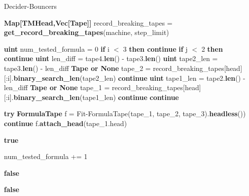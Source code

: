 \begin{algorithm}[h!]
    \caption{{\sc Decider-Bouncers}}\label{alg:decider-bouncers}
    \begin{algorithmic}[1]


        \State \textbf{Map[TMHead,Vec[Tape]]} record\_breaking\_tapes = \textbf{get\_record\_breaking\_tapes}(machine, step\_limit)

        \State \textbf{uint} num\_tested\_formula = 0
        \State \textbf{if} i $<$ 3 \textbf{then continue}
        \State \textbf{if} j $<$ 2 \textbf{then continue}
        \State \textbf{uint} len\_diff = tape4.\textbf{len}() - tape3.\textbf{len}()
        \State \textbf{uint} tape2\_len = tape3.\textbf{len}() - len\_diff
        \State \textbf{Tape or None} tape\_2 = record\_breaking\_tapes[head][:i].\textbf{binary\_search\_len}(tape2\_len)
        \State \textbf{continue}
        \EndIf
        \State
        \State \textbf{uint} tape1\_len = tape2.\textbf{len}() - len\_diff
        \State \textbf{Tape or None} tape\_1 = record\_breaking\_tapes[head][:i].\textbf{binary\_search\_len}(tape1\_len)
        \State \textbf{continue}
        \EndIf
        \State
        \State \textbf{continue}
        \EndIf

        \State

        \State \textbf{try} \textbf{FormulaTape} f = {\sc Fit-FormulaTape}(tape\_1, tape\_2, tape\_3).\textbf{headless}())
        \State \textbf{continue}
        \EndIf
        \State
        \State f.\textbf{attach\_head}(tape\_1.head)

        \State \Return \textbf{true}

        \EndIf

        \State
        \State num\_tested\_formula += 1

        \State
        \State \Return \textbf{false}
        \EndIf


        \EndFor
        \EndFor
        \EndFor
        \State \Return \textbf{false}
        \EndProcedure
    \end{algorithmic}
\end{algorithm}

